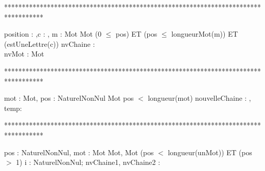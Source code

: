***********************************************************************************
\begin{algorithme}%
       {position : \naturelNonNul,c : \caractere, m : Mot}%
       {Mot}%
       {(0 $\leq$ pos) ET (pos $\leq$ longueurMot(m)) ET (estUneLettre(c))}
       {nvChaine : \chaine \\ nvMot : Mot}
       {
       }
\end{algorithme}

***********************************************************************************
\begin{algorithme}%
      {mot : Mot, pos : NaturelNonNul}%
      {Mot}%
      {pos $<$ longueur(mot)}%
      {nouvelleChaine : \chaine, temp: \caractere }%
      {
      }
\end{algorithme}

***********************************************************************************
\begin{algorithme}
         {pos : NaturelNonNul, mot : Mot}%
         {Mot, Mot}%
         {(pos $<$ longueur(unMot)) ET (pos $>$ 1)}%
         {i : NaturelNonNul; nvChaine1, nvChaine2 : \chaine}%
         {
            {
            }
            {
            }
          }
\end{algorithme}

